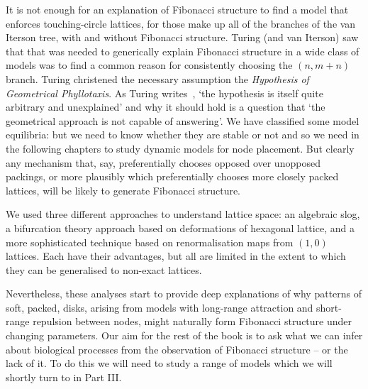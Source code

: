 It is not enough for an explanation of Fibonacci structure to find a model that enforces touching-circle lattices, for those make up all of the branches of the van Iterson tree, with and without Fibonacci structure. Turing (and van Iterson)  saw that that was needed to generically explain Fibonacci structure in a wide class of models was to find a common reason for consistently choosing the $(n,m+n)$ branch. Turing christened the necessary assumption the \emph{Hypothesis of Geometrical Phyllotaxis}. As Turing writes~\autocite{turingMorphogenTheoryPhyllotaxis2013}, 
`the hypothesis is itself quite arbitrary and unexplained' and why it should hold is a question that `the geometrical approach is not capable of answering'. We have classified some model equilibria: but we need to know whether they are stable or not and so we need in the following chapters to study dynamic models for node placement. But clearly any mechanism that, say,  preferentially chooses opposed over unopposed packings, or more plausibly which preferentially chooses more closely packed lattices, will be likely to generate Fibonacci structure.

We used three different approaches to understand lattice space: an algebraic slog, a bifurcation theory approach based on deformations of hexagonal lattice, and a more sophisticated technique based on renormalisation maps from  $(1,0)$ lattices. Each have their advantages, but all are limited in the extent to which they can be generalised to non-exact lattices. 

Nevertheless, these analyses start to provide deep explanations of why patterns of soft, packed, disks, arising from models with long-range attraction and short-range repulsion between nodes, might naturally form Fibonacci structure under changing parameters. Our aim for the rest of the book is to ask what we can infer about biological processes from the observation of Fibonacci structure -- or the lack of it. To do this we will need to study a range of models which we will shortly turn to in Part III.



